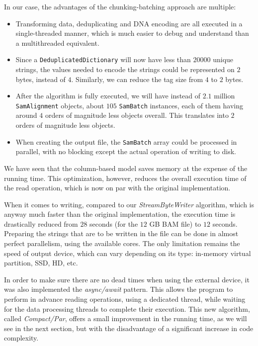 \documentclass[a4paper,twoside]{article}
\begin{document}
In our case, the advantages of the chunking-batching approach are multiple:
\begin{itemize}
\item Transforming data, deduplicating and DNA encoding are all executed in a single-threaded manner, which is much easier to debug and understand than a multithreaded equivalent.

\item Since a {\texttt{DeduplicatedDictionary}} will now have less than $20000$ unique strings, the values needed to encode the strings could be represented on $2$ bytes, instead of $4$.
Similarly, we can reduce the tag size from $4$ to $2$ bytes.

\item After the algorithm is fully executed,  we will have instead of $2.1$ million {\texttt{SamAlignment}} objects, about $105$ {\texttt{SamBatch}} instances, each of them having around $4$ orders of magnitude less objects overall.
This translates into $2$ orders of magnitude less objects.

\item When creating the output file, the {\texttt{SamBatch}} array could be processed in parallel, with no blocking except the actual operation of writing to disk.
\end{itemize}

We have seen that the column-based model saves memory at the expense of the running time.
This optimization, however, reduces the overall execution time of the read operation, which is now on par with the original implementation.

When it comes to writing, compared to our {\textit{StreamByteWriter} } algorithm, which is anyway much faster than the original implementation, the execution time is drastically reduced from $28$ seconds (for the $12$ GB BAM file) to $12$ seconds.
Preparing the strings that are to be written in the file can be done in almost perfect parallelism, using the available cores.
The only limitation remains the speed of output device, which can vary depending on its type: in-memory virtual partition, SSD, HD, etc.

In order to make sure there are no dead times when using the external device, it was also implemented the {\textit{async/await}} pattern. This allows the program to perform in advance reading operations, using a dedicated thread, while waiting for the data processing threads to complete their execution.
This new algorithm, called {\textit{Compact/Par}}, offers a small improvement in the running time, as we will see in the next section, but with the disadvantage of a significant increase in code complexity.
\end{document}
